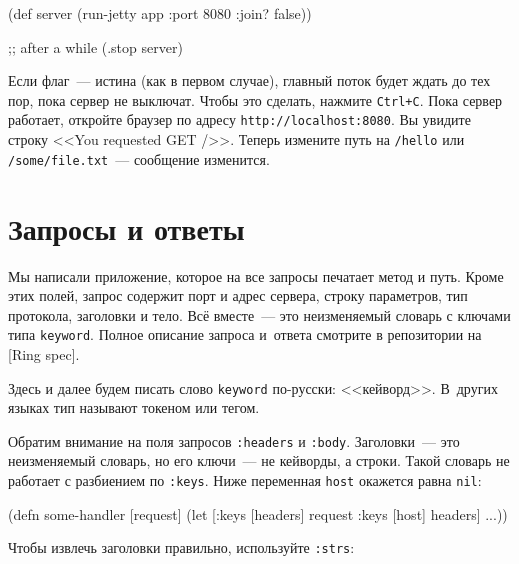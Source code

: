 \else

\begin{english}
  \begin{clojure}
(def server
  (run-jetty app {:port 8080 :join? false}))

;; after a while
(.stop server)
  \end{clojure}
\end{english}

\fi

Если флаг~--- истина (как в первом случае), главный поток будет ждать до тех
пор, пока сервер не выключат. Чтобы это сделать, нажмите \verb|Ctrl+C|. Пока
сервер работает, откройте браузер по адресу \verb|http://localhost:8080|. Вы
увидите строку <<You requested GET />>. Теперь измените путь на \verb|/hello|
или \verb|/some/file.txt|~--- сообщение изменится.

\section{Запросы и ответы}

Мы написали приложение, которое на все запросы печатает метод и путь. Кроме этих
полей, запрос содержит порт и адрес сервера, строку параметров, тип протокола,
заголовки и тело. Всё вместе~--- это неизменяемый словарь с ключами типа
\verb|keyword|. Полное описание запроса и~ответа смотрите в репозитории на
[Ring spec].

Здесь и далее будем писать слово \verb|keyword| по-русски:
<<кейворд>>. В~других языках тип называют токеном или тегом.


Обратим внимание на поля запросов \verb|:headers| и \verb|:body|. Заголовки~---
это неизменяемый словарь, но его ключи~--- не кейворды, а строки. Такой словарь не
работает с разбиением по \verb|:keys|. Ниже переменная \verb|host| окажется
равна \verb|nil|:


\begin{english}
  \begin{clojure}
(defn some-handler
  [request]
  (let [{:keys [headers]} request
        {:keys [host]} headers]
    ...))
  \end{clojure}
\end{english}


Чтобы извлечь заголовки правильно, используйте \verb|:strs|:

